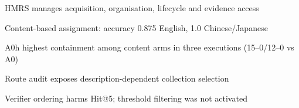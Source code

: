 \begin{highlights}
\item HMRS manages acquisition, organisation, lifecycle and evidence access
\item Content-based assignment: accuracy 0.875 English, 1.0 Chinese/Japanese
\item A0h highest containment among content arms in three executions (15--0/12--0 vs A0)
\item Route audit exposes description-dependent collection selection
\item Verifier ordering harms Hit@5; threshold filtering was not activated
\end{highlights}
